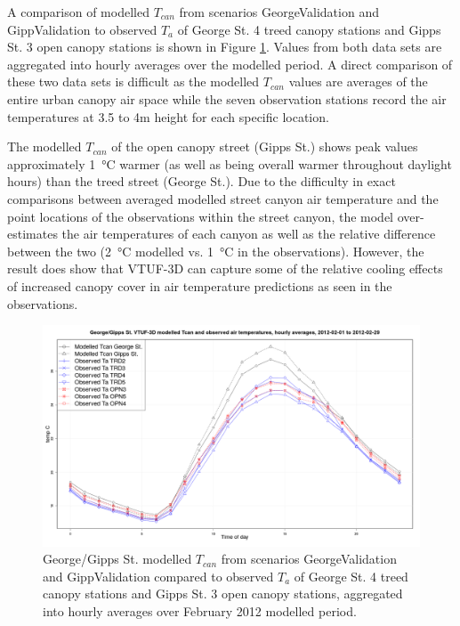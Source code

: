 \documentclass[final,3p,times,authoryear]{elsarticle}
\begin{document}
A comparison of modelled $T_{can}$ from scenarios GeorgeValidation and GippValidation to observed $T_{a}$ of George St. 4 treed canopy stations and Gipps St. 3 open canopy stations is shown in Figure \ref{fig:GeorgeGippsStTcanCompare}. Values from both data sets are aggregated into hourly averages over the modelled period. A direct comparison of these two data sets is difficult as the modelled $T_{can}$ values are averages of the entire urban canopy air space while the seven observation stations record the air temperatures at 3.5 to 4m height for each specific location. 

The modelled $T_{can}$ of the open canopy street (Gipps St.) shows peak values approximately 1\SI{}{\degreeCelsius} warmer (as well as being overall warmer throughout daylight hours) than the treed street (George St.). Due to the difficulty in exact comparisons between averaged modelled street canyon air temperature and the point locations of the observations within the street canyon, the model over-estimates the air temperatures of each canyon as well as the relative difference between the two (2\SI{}{\degreeCelsius} modelled vs. 1\SI{}{\degreeCelsius} in the observations). However, the result does show that VTUF-3D can capture some of the relative cooling effects of increased canopy cover in air temperature predictions as seen in the \cite{Coutts2015} observations.


\begin{figure}[!htbp]
\includegraphics[trim = 0mm 0mm 0mm 0mm, clip, scale=0.30]{images/GeorgeValidationTcanAgg.png}
\caption{George/Gipps St. modelled $T_{can}$ from scenarios GeorgeValidation and GippValidation compared to observed $T_{a}$ of George St. 4 treed canopy stations and Gipps St. 3 open canopy stations, aggregated into hourly averages over February 2012 modelled period.\label{fig:GeorgeGippsStTcanCompare}} 
\end{figure}
\end{document}
